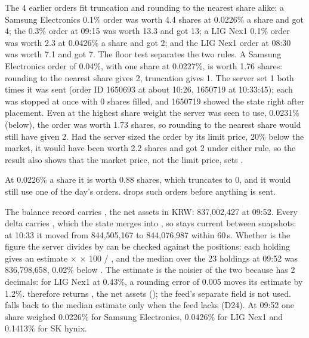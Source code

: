 \seclabel
{}

 The 4 earlier orders fit truncation and rounding to the nearest share alike: a Samsung Electronics 0.1\% order was worth 4.4 shares at 0.0226\% a share and got 4; the 0.3\% order at 09:15 was worth 13.3 and got 13; a LIG Nex1 0.1\% order was worth 2.3 at 0.0426\% a share and got 2; and the LIG Nex1 order at 08:30 was worth 7.1 and got 7. The floor test separates the two rules. A Samsung Electronics order of 0.04\%, with one share at 0.0227\%, is worth 1.76 shares: rounding to the nearest share gives 2, truncation gives 1. The server set  1 both times it was sent (order ID 1650693 at about 10:26, 1650719 at 10:33:45); each was stopped at once with 0 shares filled, and 1650719 showed the state  right after placement. Even at the highest share weight the server was seen to use, 0.0231\% (below), the order was worth 1.73 shares, so rounding to the nearest share would still have given 2. Had the server sized the order by its limit price, 20\% below the market, it would have been worth 2.2 shares and got 2 under either rule, so the result also shows that the market price, not the limit price, sets .



 At 0.0226\% a share it is worth 0.88 shares, which truncates to 0, and it would still use one of the day's orders.  drops such orders before anything is sent.

 The balance record  carries , the net assets in KRW: 837,002,427 at 09:52. Every delta carries , which the state merges into , so  stays current between snapshots: at 10:33 it moved from 844,505,167 to 844,076,987 within 60\,s. Whether  is the figure the server divides by can be checked against the positions: each holding gives an estimate  $\times$  $\times$ 100 / , and the median over the 23 holdings at 09:52 was 836,798,658, 0.02\% below . The estimate is the noisier of the two because  has 2 decimals: for LIG Nex1 at 0.43\%, a rounding error of 0.005 moves its estimate by 1.2\%.  therefore returns , the net assets (); the feed's separate  field is not used.  falls back to the median estimate only when the feed lacks  (D24). At 09:52 one share weighed 0.0226\% for Samsung Electronics, 0.0426\% for LIG Nex1 and 0.1413\% for SK hynix.

